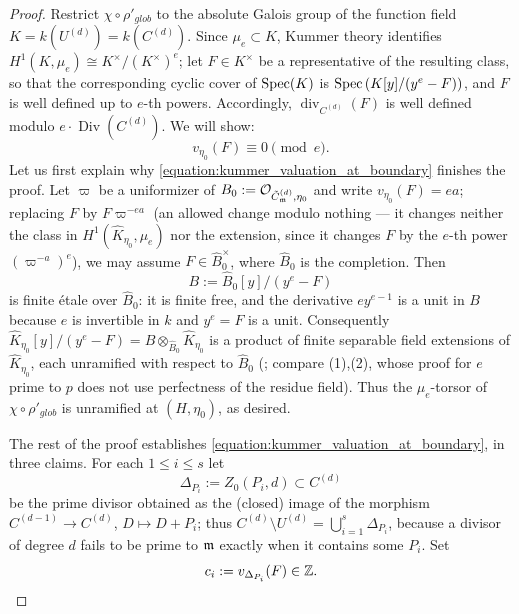 \begin{proof}
    Restrict $\chi \circ \rho'_{glob}$ to the absolute Galois group of the function field
    $K = k(U^{(d)}) = k(C^{(d)})$. Since $\mu_e \subset K$, Kummer theory identifies
    $H^1(K, \mu_e) \cong K^\times / (K^\times)^e$; let $F \in K^\times$ be a representative of the
    resulting class, so that the corresponding cyclic cover of $\operatorname{Spec}(K)$ is
    $\operatorname{Spec}\left(K[y]/(y^e - F)\right)$, and $F$ is well defined up to $e$-th powers. Accordingly,
    $\operatorname{div}_{C^{(d)}}(F)$ is well defined modulo $e \cdot \operatorname{Div}(C^{(d)})$.
    We will show:
    \begin{equation}\label{equation:kummer_valuation_at_boundary}
        v_{\eta_0}(F) \equiv 0 \pmod{e}.
    \end{equation}
    Let us first explain why \eqref{equation:kummer_valuation_at_boundary} finishes the proof.
    Let $\varpi$ be a uniformizer of $B_0 := \mathcal{O}_{\tilde{C}_{\mathfrak{m}}^{(d)}, \eta_0}$ and write
    $v_{\eta_0}(F) = e a$; replacing $F$ by $F \varpi^{-ea}$ (an allowed change modulo nothing --- it
    changes neither the class in $H^1(\widehat{K}_{\eta_0}, \mu_e)$ nor the extension, since it changes
    $F$ by the $e$-th power $\left(\varpi^{-a}\right)^e$), we may assume $F \in \widehat{B}_0^\times$, where
    $\widehat{B}_0$ is the completion. Then
    \[ B := \widehat{B}_0[y]/(y^e - F) \]
    is finite \'etale over $\widehat{B}_0$: it is finite free, and the derivative $e y^{e-1}$ is a unit
    in $B$ because $e$ is invertible in $k$ and $y^e = F$ is a unit. Consequently
    $\widehat{K}_{\eta_0}[y]/(y^e - F) = B \otimes_{\widehat{B}_0} \widehat{K}_{\eta_0}$ is a product of
    finite separable field extensions of $\widehat{K}_{\eta_0}$, each unramified with respect to
    $\widehat{B}_0$ (; compare
    (1),(2), whose proof for $e$ prime to $p$ does not use perfectness
    of the residue field). Thus the $\mu_e$-torsor of $\chi \circ \rho'_{glob}$ is unramified at
    $(H, \eta_0)$, as desired.

    The rest of the proof establishes \eqref{equation:kummer_valuation_at_boundary}, in three claims.
    For each $1 \leq i \leq s$ let
    \[ \Delta_{P_i} := Z_0(P_i, d) \subset C^{(d)} \]
    be the prime divisor obtained as the (closed) image of the morphism
    $C^{(d-1)} \to C^{(d)}$, $D \mapsto D + P_i$; thus
    $C^{(d)} \setminus U^{(d)} = \bigcup_{i=1}^{s} \Delta_{P_i}$, because a divisor of degree $d$ fails
    to be prime to $\mathfrak{m}$ exactly when it contains some $P_i$. Set
    \[ c_i := v_{\Delta_{P_i}}(F) \in \mathbb{Z}. \]


\end{proof}
